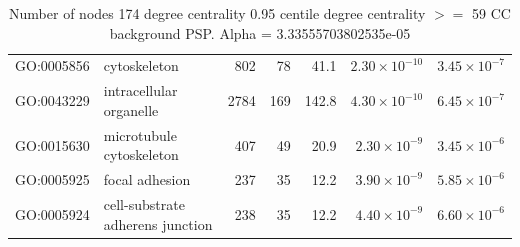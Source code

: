 \begin{table}[ht]
\begin{adjustbox}{max width=\textwidth}
\begin{tabular}{llrrrrr}
  GO:0005856 & cytoskeleton & 802 & 78 & 41.1 & $2.30 \times 10^{-10}$ & $3.45 \times 10^{-7}$ \\ 
  GO:0043229 & intracellular organelle & 2784 & 169 & 142.8 & $4.30 \times 10^{-10}$ & $6.45 \times 10^{-7}$ \\ 
  GO:0015630 & microtubule cytoskeleton & 407 & 49 & 20.9 & $2.30 \times 10^{-9}$ & $3.45 \times 10^{-6}$ \\ 
  GO:0005925 & focal adhesion & 237 & 35 & 12.2 & $3.90 \times 10^{-9}$ & $5.85 \times 10^{-6}$ \\ 
  GO:0005924 & cell-substrate adherens junction & 238 & 35 & 12.2 & $4.40 \times 10^{-9}$ & $6.60 \times 10^{-6}$ \\ 
   \hline
\end{tabular}
\end{adjustbox}
\caption{Number of nodes 174 degree centrality 0.95 centile  degree centrality $>=$ 59 CC background PSP. Alpha = 3.33555703802535e-05} 
\label{tab:Number of nodes 174 degree centrality 0.95 centile  degree centrality >= 59 CC background PSP. Alpha = 3.33555703802535e-05}
\end{table}

